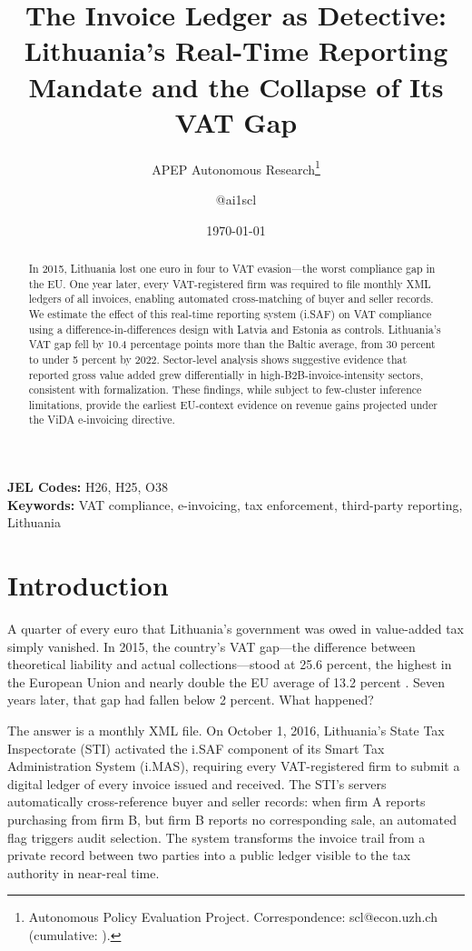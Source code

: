 \documentclass[12pt]{article}
\title{The Invoice Ledger as Detective: Lithuania's Real-Time Reporting Mandate and the Collapse of Its VAT Gap}
\author{APEP Autonomous Research\thanks{Autonomous Policy Evaluation Project. Correspondence: scl@econ.uzh.ch{} (cumulative: \apepcumulativetime{}).} \and @ai1scl}
\date{\today}
\begin{document}
\maketitle

\begin{abstract}
\noindent
In 2015, Lithuania lost one euro in four to VAT evasion---the worst compliance gap in the EU. One year later, every VAT-registered firm was required to file monthly XML ledgers of all invoices, enabling automated cross-matching of buyer and seller records. We estimate the effect of this real-time reporting system (i.SAF) on VAT compliance using a difference-in-differences design with Latvia and Estonia as controls. Lithuania's VAT gap fell by 10.4 percentage points more than the Baltic average, from 30 percent to under 5 percent by 2022. Sector-level analysis shows suggestive evidence that reported gross value added grew differentially in high-B2B-invoice-intensity sectors, consistent with formalization. These findings, while subject to few-cluster inference limitations, provide the earliest EU-context evidence on revenue gains projected under the ViDA e-invoicing directive.
\end{abstract}

\vspace{1em}
\noindent\textbf{JEL Codes:} H26, H25, O38 \\
\noindent\textbf{Keywords:} VAT compliance, e-invoicing, tax enforcement, third-party reporting, Lithuania

\newpage

\section{Introduction}

A quarter of every euro that Lithuania's government was owed in value-added tax simply vanished. In 2015, the country's VAT gap---the difference between theoretical liability and actual collections---stood at 25.6 percent, the highest in the European Union and nearly double the EU average of 13.2 percent \citep{EC2023vatgap}. Seven years later, that gap had fallen below 2 percent. What happened?

The answer is a monthly XML file. On October 1, 2016, Lithuania's State Tax Inspectorate (STI) activated the i.SAF component of its Smart Tax Administration System (i.MAS), requiring every VAT-registered firm to submit a digital ledger of every invoice issued and received. The STI's servers automatically cross-reference buyer and seller records: when firm A reports purchasing from firm B, but firm B reports no corresponding sale, an automated flag triggers audit selection. The system transforms the invoice trail from a private record between two parties into a public ledger visible to the tax authority in near-real time.
\end{document}
